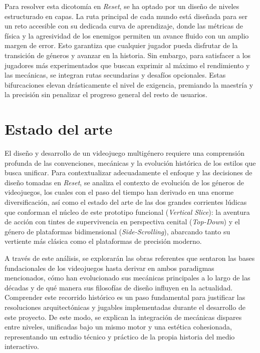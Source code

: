 Para resolver esta dicotomía en \textit{Reset}, se ha optado por un diseño de niveles estructurado en capas. La ruta principal de cada mundo está diseñada para ser un reto accesible con su dedicada curva de aprendizaje, donde las métricas de física y la agresividad de los enemigos permiten un avance fluido con un amplio margen de error. Esto garantiza que cualquier jugador pueda disfrutar de la transición de géneros y avanzar en la historia. Sin embargo, para satisfacer a los jugadores más experimentados que buscan exprimir al máximo el rendimiento y las mecánicas, se integran rutas secundarias y desafíos opcionales. Estas bifurcaciones elevan drásticamente el nivel de exigencia, premiando la maestría y la precisión sin penalizar el progreso general del resto de usuarios.


\section{Estado del arte}

El diseño y desarrollo de un videojuego multigénero requiere una comprensión profunda de las convenciones, mecánicas y la evolución histórica de los estilos que busca unificar. Para contextualizar adecuadamente el enfoque y las decisiones de diseño tomadas en \textit{Reset}, se analiza el contexto de evolución de los géneros de videojuegos, los cuales con el paso del tiempo han derivado en una enorme diversificación, así como el estado del arte de las dos grandes corrientes lúdicas que conforman el núcleo de este prototipo funcional (\textit{Vertical Slice}): la aventura de acción con tintes de supervivencia en perspectiva cenital (\textit{Top-Down}) y el género de plataformas bidimensional (\textit{Side-Scrolling}), abarcando tanto su vertiente más clásica como el plataformas de precisión moderno.

A través de este análisis, se explorarán las obras referentes que sentaron las bases fundacionales de los videojuegos hasta derivar en ambos paradigmas mencionados, cómo han evolucionado sus mecánicas principales a lo largo de las décadas y de qué manera sus filosofías de diseño influyen en la actualidad. Comprender este recorrido histórico es un paso fundamental para justificar las resoluciones arquitectónicas y jugables implementadas durante el desarrollo de este proyecto. De este modo, se explican la integración de mecánicas dispares entre niveles, unificadas bajo un mismo motor y una estética cohesionada, representando un estudio técnico y práctico de la propia historia del medio interactivo.

